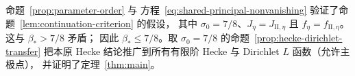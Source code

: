 命题~\ref{prop:parameter-order} 与
方程~\eqref{eq:shared-principal-nonvanishing} 验证了命题~\ref{lem:continuation-criterion} 的假设，
其中 \(\sigma_0=7/8\)、\(J_\eta=J_{\mathrm{II},\eta}\) 且
\(f_\eta=f_{\mathrm{II},\eta}\)。这与 \(\beta_*>7/8\) 矛盾；
因此 \(\beta_*\le7/8\)。取 \(\sigma_0=7/8\) 的命题~\ref{prop:hecke-dirichlet-transfer}
把本原 Hecke 结论推广到所有有限阶 Hecke 与 Dirichlet \(L\) 函数（允许主极点），
并证明了定理~\ref{thm:main}。
